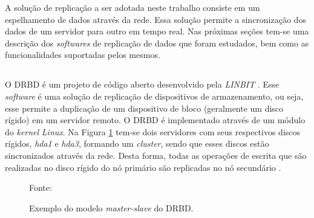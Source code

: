 A solução de replicação a ser adotada neste trabalho consiste em um espelhamento de dados através da rede. Essa solução permite a sincronização 
dos dados de um servidor para outro em tempo real.
Nas próximas seções tem-se uma descrição dos \textit{softwares} de replicação de dados que foram estudados, bem como as funcionalidades 
suportadas pelos mesmos.


\subsection{}
\label{section:drbd}
O \ac{DRBD} é um projeto de código aberto desenvolvido pela \textit{LINBIT} \cite{drbd}.
Esse \textit{software} é uma solução de replicação de dispositivos de armazenamento, ou seja, esse permite a duplicação de um dispositivo de bloco 
(geralmente um disco rígido) em um servidor remoto. O \ac{DRBD} é implementado através de um módulo do \textit{kernel} \textit{Linux}. 
Na Figura \ref{fig:drbd_basic} tem-se dois servidores com seus respectivos discos rígidos, \textit{hda1} e 
\textit{hda3}, formando um \textit{cluster}, sendo que esses discos estão sincronizados através da rede. Desta forma, todas as operações de escrita 
que são realizadas no disco rígido do nó primário são replicadas no nó secundário \cite{zaminhani2008}.

\begin{figure}[h!]
 \centering
 \caption{Exemplo do modelo \textit{master-slave} do \ac{DRBD}.}
 Fonte: \citet{jones2010}
 \label{fig:drbd_basic}
\end{figure}

